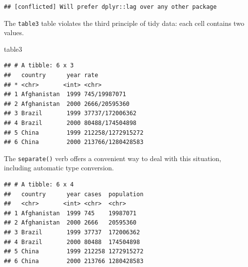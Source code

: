 \documentclass[]{book}
\newenvironment{Shaded}{}{}
\newcommand{\DataTypeTok}[1]{#1}
\newcommand{\KeywordTok}[1]{\textcolor[rgb]{0.00,0.00,1.00}{#1}}
\newcommand{\NormalTok}[1]{#1}
\newcommand{\OperatorTok}[1]{#1}
\newcommand{\OtherTok}[1]{\textcolor[rgb]{1.00,0.25,0.00}{#1}}
\newcommand{\StringTok}[1]{\textcolor[rgb]{0.00,0.50,0.50}{#1}}
\begin{document}
\begin{verbatim}
## [conflicted] Will prefer dplyr::lag over any other package
\end{verbatim}

The \texttt{table3} table violates the third principle of tidy data: each cell contains two values.

\begin{Shaded}
\begin{Highlighting}[]
\NormalTok{table3}
\end{Highlighting}
\end{Shaded}

\begin{verbatim}
## # A tibble: 6 x 3
##   country      year rate             
## * <chr>       <int> <chr>            
## 1 Afghanistan  1999 745/19987071     
## 2 Afghanistan  2000 2666/20595360    
## 3 Brazil       1999 37737/172006362  
## 4 Brazil       2000 80488/174504898  
## 5 China        1999 212258/1272915272
## 6 China        2000 213766/1280428583
\end{verbatim}

The \texttt{separate()} verb offers a convenient way to deal with this situation, including automatic type conversion.

\begin{Shaded}
\end{Shaded}

\begin{verbatim}
## # A tibble: 6 x 4
##   country      year cases  population
##   <chr>       <int> <chr>  <chr>     
## 1 Afghanistan  1999 745    19987071  
## 2 Afghanistan  2000 2666   20595360  
## 3 Brazil       1999 37737  172006362 
## 4 Brazil       2000 80488  174504898 
## 5 China        1999 212258 1272915272
## 6 China        2000 213766 1280428583
\end{verbatim}

\begin{Shaded}
\end{Shaded}
\end{document}
